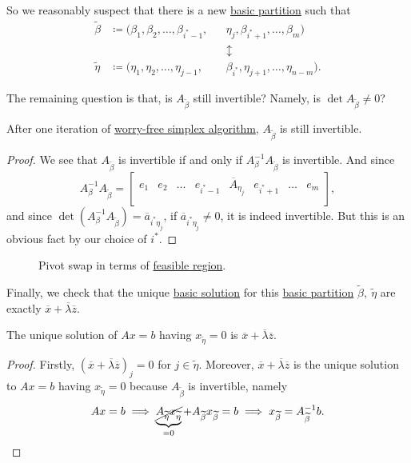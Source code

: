 So we reasonably suspect that there is a new \hyperref[def:basic-partition]{basic partition} such that
\[
	\begin{alignedat}{5}
		\widetilde{\beta} & \coloneqq ( \beta_1, \beta_2, \dots , \beta_{i^{\ast}-1}, &  & \eta_{j}, \beta_{i^{\ast}+1}, \dots , \beta_m )     \\
		                  &                                                           &  & \updownarrow                                        \\
		\widetilde{\eta}  & \coloneqq ( \eta_1, \eta_2, \dots , \eta_{j - 1},         &  & \beta_{i^{\ast}}, \eta_{j+1}, \dots , \eta_{n-m} ).
	\end{alignedat}
\]

The remaining question is that, is \(A_{\widetilde{\beta}}\) still invertible? Namely, is \(\det A_{\widetilde{\beta}} \neq 0\)?
\begin{lemma}\label{lma:lec7-3}
	After one iteration of \hyperref[algo:worry-free-simplex-algorithm]{worry-free simplex algorithm}, \(A_{\widetilde{\beta}}\) is still invertible.
\end{lemma}
\begin{proof}
	We see that \(A_{\widetilde{\beta}}\) is invertible if and only if \(A^{-1}_{\beta}A_{\widetilde{\beta}}\) is invertible. And since
	\[
		A^{-1}_{\beta}A_{\widetilde{\beta}} = \begin{bmatrix}
			e_1 & e_2 & \dots & e_{i^{\ast}-1} & \overline{A}_{\eta_{j}} & e_{i^{\ast}+1} & \dots & e_m \\
		\end{bmatrix},
	\]
	and since \(\det(A^{-1}_\beta A_{\widetilde{\beta}}) = \overline{a}_{i^{\ast} \eta_{j}}\), if \(\overline{a}_{i^{\ast} \eta_{j}}\neq 0\), it is indeed invertible. But this is an obvious fact by our choice of \(i^{\ast}\).
\end{proof}

\begin{figure}[H]
	\centering
	\caption{Pivot swap in terms of \hyperref[def:feasible-region]{feasible region}.}
	\label{fig:pivot-swap}
\end{figure}

Finally, we check that the unique \hyperref[def:basic-solution]{basic solution} for this \hyperref[def:basic-partition]{basic partition}
\(\widetilde{\beta},\ \widetilde{\eta}\) are exactly \(\overline{x} + \overline{\lambda}\overline{z}\).
\begin{lemma}\label{lma:lec7-4}
	The unique solution of \(Ax = b\) having \(x_{\widetilde{\eta}} = 0\) is \(\overline{x} + \overline{\lambda}\overline{z}\).
\end{lemma}
\begin{proof}
	Firstly, \((\overline{x} + \overline{\lambda}\overline{z})_j = 0\) for \(j\in \widetilde{\eta}\). Moreover, \(\overline{x} + \overline{\lambda}\overline{z}\) is
	the unique solution to \(Ax = b\) having \(x_{\widetilde{\eta}} = 0\) because \(A_{\widetilde{\beta}}\) is invertible, namely
	\[
		Ax = b \implies \underbrace{\cancel{A_{\widetilde{\eta}}x_{\widetilde{\eta}}}}_{=0} + A_{\widetilde{\beta}}x_{\widetilde{\beta}} = b \implies x_{\widetilde{\beta}} = A^{-1}_{\widetilde{\beta}}b.
	\]
\end{proof}